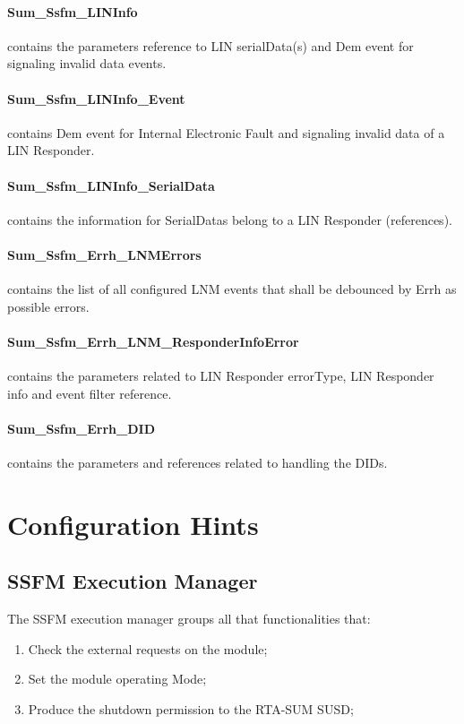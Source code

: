 \paragraph{Sum\_Ssfm\_LINInfo} contains the parameters reference to LIN serialData(s) and Dem event for signaling invalid data events.

\paragraph{Sum\_Ssfm\_LINInfo\_Event} contains Dem event for Internal Electronic Fault and signaling invalid data of a LIN Responder.

\paragraph{Sum\_Ssfm\_LINInfo\_SerialData} contains the information for SerialDatas belong to a LIN Responder (references).

\paragraph{Sum\_Ssfm\_Errh\_LNMErrors} contains the list of all configured LNM events that shall be debounced by Errh as possible errors.

\paragraph{Sum\_Ssfm\_Errh\_LNM\_ResponderInfoError} contains the parameters related to LIN Responder errorType, LIN Responder info and event filter reference.

\paragraph{Sum\_Ssfm\_Errh\_DID} contains the parameters and references related to handling the DIDs.

\section{Configuration Hints}

\subsection{SSFM Execution Manager}
\label{subsec:executionmask}
The SSFM execution manager groups all that functionalities that:

\begin{enumerate}
    \item Check the external requests on the module;
    \item Set the module operating Mode;
    \item Produce the shutdown permission to the RTA-SUM SUSD; 
\end{enumerate}

